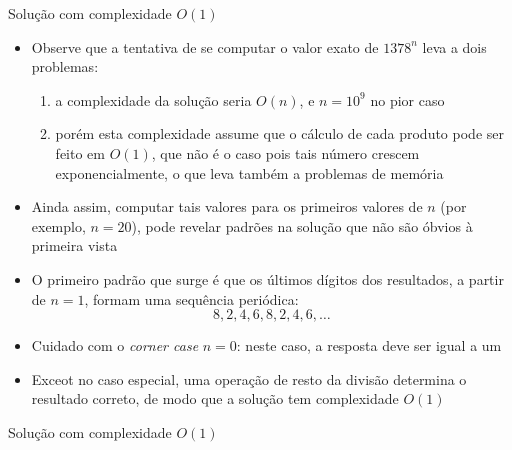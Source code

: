 \begin{frame}[fragile]{Solução com complexidade $O(1)$}

    \begin{itemize}
        \item Observe que a tentativa de se computar o valor exato de $1378^n$ leva a dois
            problemas:
            \begin{enumerate}
                \item a complexidade da solução seria $O(n)$, e $n = 10^{9}$ no pior caso

                \item porém esta complexidade assume que o cálculo de cada produto pode ser
                    feito em $O(1)$, que não é o caso pois tais número crescem exponencialmente,
                    o que leva também a problemas de memória 
            \end{enumerate}

        \item Ainda assim, computar tais valores para os primeiros valores de $n$ (por exemplo,
            $n = 20$), pode revelar padrões na solução que não são óbvios à primeira vista

        \item O primeiro padrão que surge é que os últimos dígitos dos resultados, a partir de
            $n = 1$, formam uma sequência periódica: 
            \[
                8, 2, 4, 6, 8, 2, 4, 6, \ldots
            \] 

        \item Cuidado com o \textit{corner case} $n = 0$: neste caso, a resposta deve ser igual
            a um 

        \item Exceot no caso especial, uma operação de resto da divisão determina o 
            resultado correto, de modo que a solução tem complexidade $O(1)$
   \end{itemize}

\end{frame}

\begin{frame}[fragile]{Solução com complexidade $O(1)$}
\end{frame}

